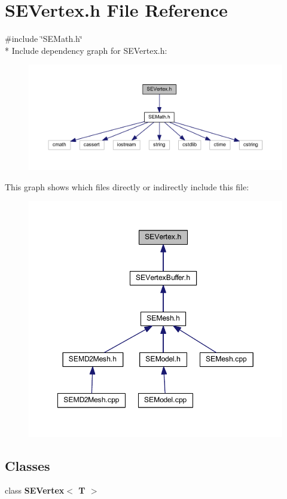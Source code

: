 \section{S\+E\+Vertex.\+h File Reference}
\label{_s_e_vertex_8h}
{\ttfamily \#include \char`\"{}S\+E\+Math.\+h\char`\"{}}\\*
Include dependency graph for S\+E\+Vertex.\+h\+:
\nopagebreak
\begin{figure}[H]
\begin{center}
\leavevmode
\includegraphics[width=350pt]{_s_e_vertex_8h__incl}
\end{center}
\end{figure}
This graph shows which files directly or indirectly include this file\+:
\nopagebreak
\begin{figure}[H]
\begin{center}
\leavevmode
\includegraphics[width=349pt]{_s_e_vertex_8h__dep__incl}
\end{center}
\end{figure}
\subsection*{Classes}
\begin{DoxyCompactItemize}
\item 
class {\bf S\+E\+Vertex$<$ T $>$}
\end{DoxyCompactItemize}
